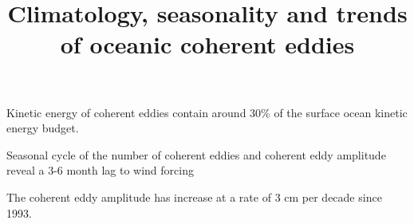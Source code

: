\documentclass[draft,linenumbers]{agujournal2019}
\begin{document}
\title{Climatology, seasonality and trends of oceanic coherent eddies}



\begin{keypoints}
	\item Kinetic energy of coherent eddies contain around 30\% of the surface ocean kinetic energy budget.
	\item Seasonal cycle of the number of coherent eddies and coherent eddy amplitude reveal a 3-6 month lag to wind forcing
	\item The coherent eddy amplitude has increase at a rate of 3 cm per decade since 1993.
\end{keypoints}
\end{document}
